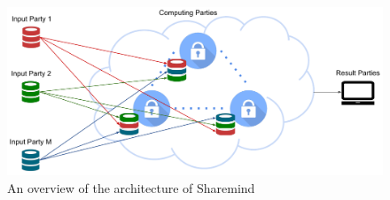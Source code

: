 \begin{figure}[th]
  \centering
  \includegraphics[width=\linewidth]{figures/sharemind_infrastructure.pdf}
  \caption{An overview of the architecture of Sharemind}\label{f:sharemind}
\end{figure}


